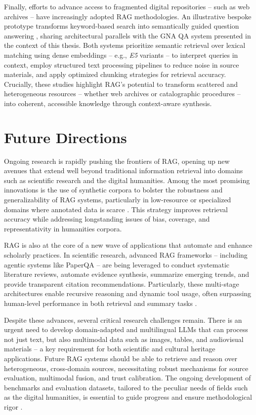 \begin{spacing}{1.5}
Finally, efforts to advance access to fragmented digital repositories -- such as web archives -- have increasingly adopted RAG methodologies. An illustrative bespoke prototype transforms keyword-based search into semantically guided question answering \citep{davis_unlocking_2025}, sharing architectural parallels with the GNA QA system presented in the context of this thesis. Both systems prioritize semantic retrieval over lexical matching using dense embeddings -- e.g., \textit{E5} variants \citep{wang_text_2024} -- to interpret queries in context, employ structured text processing pipelines to reduce noise in source materials, and apply optimized chunking strategies for retrieval accuracy. Crucially, these studies highlight RAG’s potential to transform scattered and heterogeneous resources -- whether web archives or catalographic procedures -- into coherent, accessible knowledge through context-aware synthesis.

\section{Future Directions}
Ongoing research is rapidly pushing the frontiers of RAG, opening up new avenues  that extend well beyond traditional information retrieval into domains such as scientific research and the digital humanities. Among the most promising innovations is the use of synthetic corpora to bolster the robustness and generalizability of RAG systems, particularly in low-resource or specialized domains where annotated data is scarce \citep{bor-woei_generative_2024}. This strategy improves retrieval accuracy while addressing longstanding issues of bias, coverage, and representativity in humanities corpora. 

RAG is also at the core of a new wave of applications that automate and enhance scholarly practices. In scientific research, advanced RAG frameworks -- including agentic systems like PaperQA \citep{lala_paperqa_2023} -- are being leveraged to conduct systematic literature reviews, automate evidence synthesis, summarize emerging trends, and provide transparent citation recommendations. Particularly, these multi-stage architectures enable recursive reasoning and dynamic tool usage, often surpassing human-level performance in both retrieval and summary tasks \citep{skarlinski_language_2024}. 

Despite these advances, several critical research challenges remain. There is an urgent need to develop domain-adapted and multilingual LLMs that can process not just text, but also multimodal data such as images, tables, and audiovisual materials -- a key requirement for both scientific and cultural heritage applications. Future RAG systems should be able to retrieve and reason over heterogeneous, cross-domain sources, necessitating robust mechanisms for source evaluation, multimodal fusion, and trust calibration. The ongoing development of benchmarks and evaluation datasets, tailored to the peculiar needs of fields such as the digital humanities, is essential to guide progress and ensure methodological rigor \citep{yue_survey_2025}.


\end{spacing}
